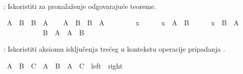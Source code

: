 \begin{isabellebody}
\begin{exercise}[subtitle=Isar dokazi]
\ \ %
\isadelimproof
%
\endisadelimproof
%
\isatagproof
%
\endisatagproof
{\isafoldproof}%
%
\isadelimproof
%
\endisadelimproof
%
\begin{isamarkuptext}%
: Iskoristiti  
               za pronalaženje odgovarajuće teoreme.%
\end{isamarkuptext}\isamarkuptrue%
\isamarkupfalse%
\ {\isachardoublequoteopen}A\ {\isasymunion}\ B\ {\isacharequal}{\kern0pt}\ B\ {\isasymunion}\ A{\isachardoublequoteclose}\isanewline
%
\isadelimproof
%
\endisadelimproof
%
\isatagproof
{}\isamarkupfalse%
\isanewline
\ \ \isamarkupfalse%
\ {\isachardoublequoteopen}A\ {\isasymunion}\ B\ {\isasymsubseteq}\ B\ {\isasymunion}\ A{\isachardoublequoteclose}\isanewline
\ \ \isamarkupfalse%
\isanewline
\ \ \ \ \isamarkupfalse%
\ x\isanewline
\ \ \ \ \isamarkupfalse%
\ {\isachardoublequoteopen}x\ {\isasymin}\ A\ {\isasymunion}\ B{\isachardoublequoteclose}\isanewline
\ \ \ \ \isamarkupfalse%
\ {\isachardoublequoteopen}x\ {\isasymin}\ B\ {\isasymunion}\ A{\isachardoublequoteclose}\isanewline
\ \ \ \ \ \ \ \isamarkupfalse%
\isanewline
{}\isamarkupfalse%
\isanewline
\ \ \isamarkupfalse%
\ {\isachardoublequoteopen}B\ {\isasymunion}\ A\ {\isasymsubseteq}\ A\ {\isasymunion}\ B{\isachardoublequoteclose}\isanewline
\ \ \ \ \isamarkupfalse%
%
\endisatagproof
{\isafoldproof}%
%
\isadelimproof
%
\endisadelimproof
%
\begin{isamarkuptext}%
: Iskoristiti aksiomu isključenja trećeg 
               u kontekstu operacije pripadanja .%
\end{isamarkuptext}\isamarkuptrue%
\isamarkupfalse%
\ {\isachardoublequoteopen}A\ {\isasymunion}\ {\isacharparenleft}{\kern0pt}B\ {\isasyminter}\ C{\isacharparenright}{\kern0pt}\ {\isacharequal}{\kern0pt}\ {\isacharparenleft}{\kern0pt}A\ {\isasymunion}\ B{\isacharparenright}{\kern0pt}\ {\isasyminter}\ {\isacharparenleft}{\kern0pt}A\ {\isasymunion}\ C{\isacharparenright}{\kern0pt}{\isachardoublequoteclose}\ {\isacharparenleft}{\kern0pt}\ {\isachardoublequoteopen}{\isacharquery}{\kern0pt}left\ {\isacharequal}{\kern0pt}\ {\isacharquery}{\kern0pt}right{\isachardoublequoteclose}{\isacharparenright}{\kern0pt}\isanewline

\end{exercise}
\end{isabellebody}
